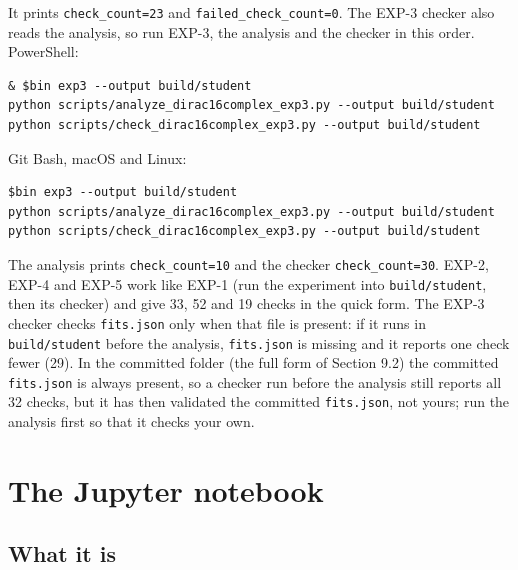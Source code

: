 \documentclass[11pt]{article}
\begin{document}
It prints \texttt{check\_co\allowbreak{}unt=23} and \texttt{failed\_c\allowbreak{}heck\_cou\allowbreak{}nt=0}. The EXP-3 checker also reads the analysis, so run EXP-3, the analysis and the checker in this order. PowerShell:

\begin{Verbatim}[fontsize=\small]
& $bin exp3 --output build/student
python scripts/analyze_dirac16complex_exp3.py --output build/student
python scripts/check_dirac16complex_exp3.py --output build/student
\end{Verbatim}

Git Bash, macOS and Linux:

\begin{Verbatim}[fontsize=\small]
$bin exp3 --output build/student
python scripts/analyze_dirac16complex_exp3.py --output build/student
python scripts/check_dirac16complex_exp3.py --output build/student
\end{Verbatim}

The analysis prints \texttt{check\_co\allowbreak{}unt=10} and the checker \texttt{check\_co\allowbreak{}unt=30}. EXP-2, EXP-4 and EXP-5 work like EXP-1 (run the experiment into \texttt{build/st\allowbreak{}udent}, then its checker) and give 33, 52 and 19 checks in the quick form. The EXP-3 checker checks \texttt{fits.jso\allowbreak{}n} only when that file is present: if it runs in \texttt{build/st\allowbreak{}udent} before the analysis, \texttt{fits.jso\allowbreak{}n} is missing and it reports one check fewer (29). In the committed folder (the full form of Section 9.2) the committed \texttt{fits.jso\allowbreak{}n} is always present, so a checker run before the analysis still reports all 32 checks, but it has then validated the committed \texttt{fits.jso\allowbreak{}n}, not yours; run the analysis first so that it checks your own.

\section{The Jupyter notebook}

\subsection{What it is}
\end{document}
